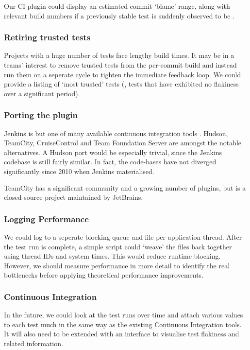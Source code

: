 Our CI plugin could display an estimated commit {\lq}blame{\rq} range, along
with relevant build numbers if a previously stable test is suddenly observed to
be \flaky.

\subsubsection{Retiring trusted tests}

Projects with a huge number of tests face lengthy build times. It may be in a
teams' interest to remove trusted tests from the per-commit build and instead
run them on a seperate cycle to tighten the immediate feedback loop. We could
provide a listing of {\lq}most trusted{\rq} tests (\ie, tests that have
exhibited no flakiness over a significant period).

\subsubsection{Porting the plugin}

Jenkins is but one of many available continuous integration tools
\cite{ContinuousIntegrationSoftware}. Hudson, TeamCity, CruiseControl and Team
Foundation Server are amongst the notable alternatives. A Hudson port would be
especially trivial, since the Jenkins codebase is still fairly similar. In fact,
the code-bases have not diverged significantly since 2010 when Jenkins
materialised.

TeamCity \cite{TeamCity} has a significant community and a growing number of
plugins, but is a closed source project maintained by JetBrains.

\subsubsection{Logging Performance}

We could log to a seperate blocking queue and file per application thread. After
the test run is complete, a simple script could {\lq}weave{\rq} the files back
together using thread IDs and system times. This would reduce runtime blocking.
However, we should measure performance in more detail to identify the real
bottlenecks before applying theoretical performance improvements.

\subsubsection{Continuous Integration}
In the future, we could look at the test runs over time and attach various
values to each test much in the same way as the existing Continuous Integration
tools. It will also need to be extended with an interface to visualise test
flakiness and related information.
